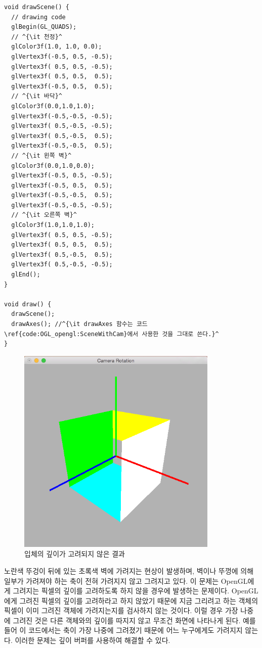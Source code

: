\begin{algorithmbis}[입체 도형 그리기 예제]\label{code:OGL_opengl:3DObjects}
\lstset{language=C++, escapechar=^} 
\begin{lstlisting}
void drawScene() {
  // drawing code
  glBegin(GL_QUADS);
  // ^{\it 천정}^
  glColor3f(1.0, 1.0, 0.0);
  glVertex3f(-0.5, 0.5, -0.5);
  glVertex3f( 0.5, 0.5, -0.5);
  glVertex3f( 0.5, 0.5,  0.5);
  glVertex3f(-0.5, 0.5,  0.5);
  // ^{\it 바닥}^
  glColor3f(0.0,1.0,1.0);
  glVertex3f(-0.5,-0.5, -0.5);
  glVertex3f( 0.5,-0.5, -0.5);
  glVertex3f( 0.5,-0.5,  0.5);
  glVertex3f(-0.5,-0.5,  0.5);
  // ^{\it 왼쪽 벽}^
  glColor3f(0.0,1.0,0.0);
  glVertex3f(-0.5, 0.5, -0.5);
  glVertex3f(-0.5, 0.5,  0.5);
  glVertex3f(-0.5,-0.5,  0.5);
  glVertex3f(-0.5,-0.5, -0.5);
  // ^{\it 오른쪽 벽}^
  glColor3f(1.0,1.0,1.0);
  glVertex3f( 0.5, 0.5, -0.5);
  glVertex3f( 0.5, 0.5,  0.5);
  glVertex3f( 0.5,-0.5,  0.5);
  glVertex3f( 0.5,-0.5, -0.5);
  glEnd();
}

void draw() {
  drawScene();
  drawAxes(); //^{\it drawAxes 함수는 코드 \ref{code:OGL_opengl:SceneWithCam}에서 사용한 것을 그대로 쓴다.}^
}
\end{lstlisting}
\end{algorithmbis}


\begin{figure}[h!]
  \centering
    \includegraphics[height=10cm]{OGL_opengl/noZBuff.png}
    \caption{입체의 깊이가 고려되지 않은 결과}
    \label{fig:OGL_opengl:noZBuff}
\end{figure}

노란색 뚜겅이 뒤에 있는 초록색 벽에 가려지는 현상이 발생하며, 벽이나 뚜껑에 의해 일부가 가려져야 하는 축이 전혀 가려지지 않고 그려지고 있다.
이 문제는 OpenGL에게 그려지는 픽셀의 깊이를 고려하도록 하지 않을 경우에 발생하는 문제이다.
OpenGL에게 그려진 픽셀의 깊이를 고려하라고 하지 않았기 때문에 지금 그리려고 하는 객체의 픽셀이 
이미 그려진 객체에 가려지는지를 검사하지 않는 것이다.
이럴 경우 가장 나중에 그려진 것은 다른 객체와의 깊이를 따지지 않고 무조건 화면에 나타나게 된다.
예를 들어 이 코드에서는 축이 가장 나중에 그려졌기 때문에 어느 누구에게도 가려지지 않는다.
이러한 문제는 깊이 버퍼를 사용하여 해결할 수 있다.

